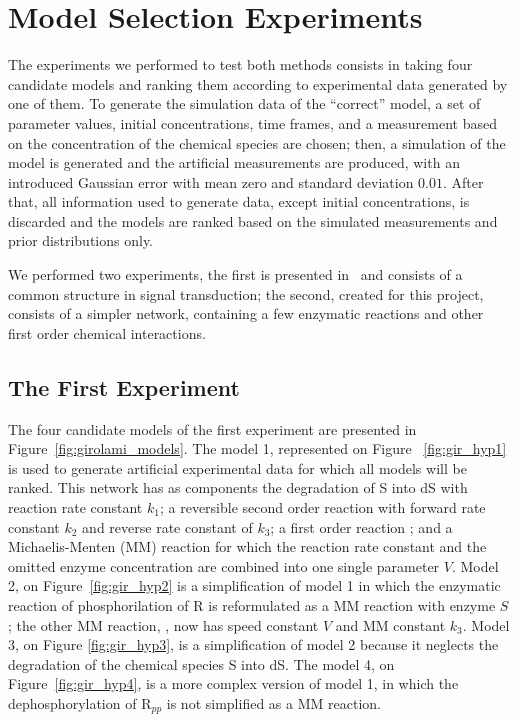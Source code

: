 \section{Model Selection Experiments}
The experiments we performed to test both methods consists in taking 
four candidate models and ranking them according to experimental data 
generated by one of them. To generate the simulation data of the 
``correct'' model, a set of parameter values, initial concentrations, 
time frames, and a measurement based on the concentration of the 
chemical species are chosen; then, a simulation of the model is 
generated and the artificial measurements are produced, with an 
introduced Gaussian error with mean zero and standard deviation $0.01$. 
After that, all information used to generate data, except initial 
concentrations, is discarded and the models are ranked based on the 
simulated measurements and prior distributions only.

We performed two experiments, the first is presented 
in~\cite{Vyshemirsky2007} and consists of a common structure in signal 
transduction; the second, created for this project, consists of a 
simpler network, containing a few enzymatic reactions and other first 
order chemical interactions.



\subsection{The First Experiment}
\label{sec:experiment_one}
The four candidate models of the first experiment are presented in 
Figure~\ref{fig:girolami_models}. The model 1, represented on Figure
~\ref{fig:gir_hyp1} is used to generate artificial experimental data
for which all models will be ranked. This network has as components the
degradation of S into dS with reaction rate constant $k_1$; a reversible 
second order reaction  with forward rate constant $k_2$ 
and reverse rate constant of $k_3$; a first order reaction 
; and a Michaelis-Menten (MM) reaction  
for which the reaction rate constant and the omitted enzyme 
concentration are combined into one single parameter $V$. Model 2, on 
Figure~\ref{fig:gir_hyp2} is a simplification of model 1 in which the
enzymatic reaction of phosphorilation of R is reformulated as a 
MM reaction with enzyme $S$; the other MM reaction, , 
now has speed constant $V$ and MM constant $k_3$. Model 3, on Figure
\ref{fig:gir_hyp3}, is a simplification of model 2 because it neglects 
the degradation of the chemical species S into dS. The model 4, on 
Figure~\ref{fig:gir_hyp4}, is a more complex version of model 1, in 
which the dephosphorylation of R$_{pp}$ is not simplified as a MM 
reaction.

